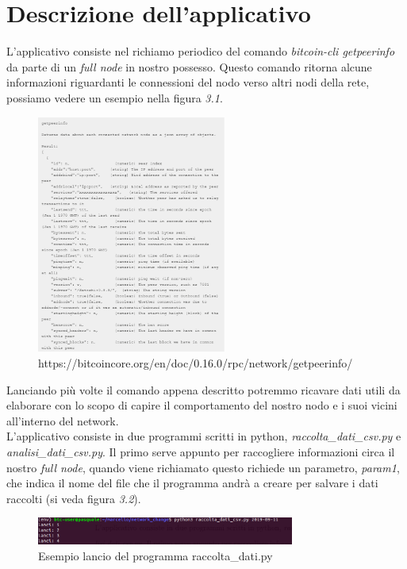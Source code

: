 \section{Descrizione dell'applicativo}
L'applicativo consiste nel richiamo periodico del comando \textit{bitcoin-cli getpeerinfo} da parte di un \textit{full node} in nostro possesso. Questo comando ritorna alcune informazioni riguardanti le connessioni del nodo verso altri nodi della rete, possiamo vedere un esempio nella figura \textit{3.1}.
\begin{figure}[H]
\begin{center}
   \includegraphics[width=0.555\textwidth]{imgs/getpeerinfo.png}
   \caption{https://bitcoincore.org/en/doc/0.16.0/rpc/network/getpeerinfo/}
   \end{center}
   \hfill
\end{figure}
Lanciando pi\`u volte il comando appena descritto potremmo ricavare dati utili da elaborare con lo scopo di capire il comportamento del nostro nodo e i suoi vicini all'interno del network.\\
L'applicativo consiste in due programmi scritti in python, \textit{raccolta\_dati\_csv.py} e \textit{analisi\_dati\_csv.py}.
Il primo serve appunto per raccogliere informazioni circa il nostro \textit{full node}, quando viene richiamato questo richiede un parametro, \textit{param1}, che indica il nome del file che il programma andr\`a a creare per salvare i dati raccolti (si veda figura \textit{3.2}).
\begin{figure}[htb]
\begin{center}
   \includegraphics[width=0.755\textwidth]{imgs/raccolta_dati_csv.png}
   \caption{Esempio lancio del programma raccolta\_dati.py}
   \end{center}
   \hfill
\end{figure}
